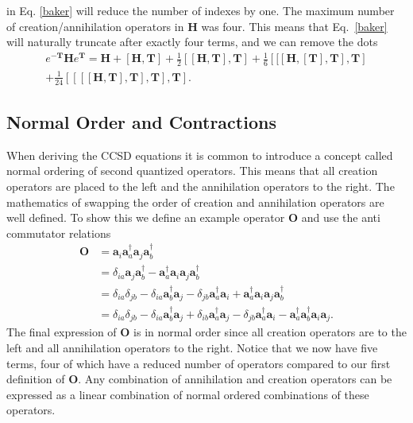 \documentclass[a4paper,norsk,11pt,twoside]{report}
\begin{document}
in Eq. \eqref{baker} will reduce the number of indexes by one. The
maximum number of creation/annihilation operators in $\textbf{H}$ was
four. This means that Eq.~\eqref{baker} will naturally truncate after exactly
four terms, and we can remove the dots
\begin{equation}
\begin{split}
e^{-\textbf{T}} \textbf{H} e^{\textbf{T}} = 
\textbf{H} 
+ \left[ \textbf{H}, \textbf{T} \right] 
+ \frac{1}{2} \left[ [\textbf{H}, \textbf{T}], \textbf{T} \right] 
+ \frac{1}{6} \left[ [ [ \textbf{H},[\textbf{T}], \textbf{T}], \textbf{T} \right] \\
+ \frac{1}{24} \left[ [ [ [\textbf{H}, \textbf{T}], \textbf{T}], \textbf{T}], \textbf{T}  \right] .
\end{split}  \label{variationalccsd}
\end{equation}

\subsection{Normal Order and Contractions}
When deriving the CCSD equations it is common to introduce a concept
called normal ordering of second quantized operators. This means that
all creation operators are placed to the left and the annihilation
operators to the right. The mathematics of swapping the order of
creation and annihilation operators are well defined. To show this we
define an example operator $\textbf{O}$ and use the anti commutator
relations
\begin{align}
\textbf{O} & = 
\textbf{a}_i 
\textbf{a}^{\dag}_a 
\textbf{a}_j 
\textbf{a}^{\dag}_b \label{normalorder} \\ &
= \delta_{ia} 
\textbf{a}_j 
\textbf{a}^{\dag}_b - 
\textbf{a}^{\dag}_a 
\textbf{a}_i  
\textbf{a}_j 
\textbf{a}^{\dag}_b \nonumber \\ &
= \delta_{ia} \delta_{jb} -
\delta_{ia} 
\textbf{a}^{\dag}_b
\textbf{a}_j -
\delta_{jb}
\textbf{a}^{\dag}_a
\textbf{a}_i +
\textbf{a}^{\dag}_a
\textbf{a}_i
\textbf{a}_j
\textbf{a}^{\dag}_b \nonumber \\ &
= \delta_{ia} \delta_{jb} - 
\delta_{ia} 
\textbf{a}^{\dag}_b
\textbf{a}_j +
\delta_{ib} 
\textbf{a}^{\dag}_a
\textbf{a}_j -
\delta_{jb} 
\textbf{a}^{\dag}_a
\textbf{a}_i -
\textbf{a}^{\dag}_a
\textbf{a}^{\dag}_b
\textbf{a}_i
\textbf{a}_j .
\end{align}
The final expression of $\textbf{O}$ is in normal order since all
creation operators are to the left and all annihilation operators to
the right. Notice that we now have five terms, four of which have a
reduced number of operators compared to our first definition of
$\textbf{O}$. Any combination of annihilation and creation operators
can be expressed as a linear combination of normal ordered
combinations of these operators. \\
\end{document}
